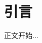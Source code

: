 \documentclass{SCIS2015cn}
\begin{document}

\abstract{}

\enabstract{}


\keywords{}

\enkeywords{}


\section{引言}

正文开始...





\end{document}
